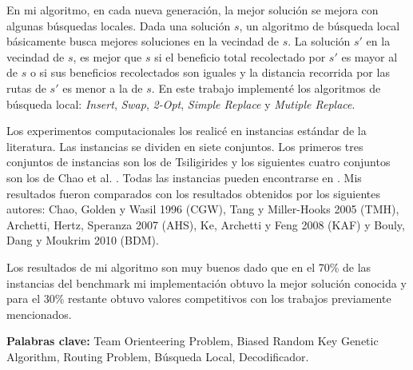 \bigskip

En mi algoritmo, en cada nueva generación, la mejor solución se mejora con algunas búsquedas locales. Dada una solución $s$, un algoritmo de búsqueda local básicamente busca mejores soluciones en la vecindad de $s$. La solución $s'$ en la vecindad de $s$, es mejor que $s$ si el beneficio total recolectado por $s'$ es mayor al de $s$ o si sus beneficios recolectados son iguales y la distancia recorrida por las rutas de $s'$ es menor a la de $s$. En este trabajo implementé los algoritmos de búsqueda local: \textit{Insert}, \textit{Swap}, \textit{2-Opt}, \textit{Simple Replace} y \textit{Mutiple Replace}.

\bigskip

Los experimentos computacionales los realicé en instancias estándar de la literatura. Las instancias se dividen en siete conjuntos. Los primeros tres conjuntos de instancias son los de Tsiligirides \cite{Tsiligirides} y los siguientes cuatro conjuntos son los de Chao et al. \cite{ChaoGoldenWasil}. Todas las instancias pueden encontrarse en \cite{IntancesChaoTsiligirides}. Mis resultados fueron comparados con los resultados obtenidos por los siguientes autores: Chao, Golden y Wasil 1996 \cite{ChaoGoldenWasil} (CGW), Tang y Miller-Hooks 2005 \cite{TangMillerHooks} (TMH), Archetti, Hertz, Speranza 2007 \cite{ArchettiHertzSperanza} (AHS), Ke, Archetti y Feng 2008 \cite{KeArchettiFeng} (KAF) y Bouly, Dang y Moukrim 2010 \cite{BoulyDangMoukrim} (BDM). 

\bigskip

Los resultados de mi algoritmo son muy buenos dado que en el 70\% de las instancias del benchmark mi implementación obtuvo la mejor solución conocida y para el 30\% restante obtuvo valores competitivos con los trabajos previamente mencionados.

\bigskip

\noindent\textbf{Palabras clave:} Team Orienteering Problem, Biased Random Key Genetic Algorithm, Routing Problem, Búsqueda Local, Decodificador.
